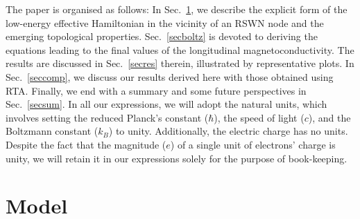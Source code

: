 \documentclass[aps,prb,onecolumn,nofootinbib,citeautoscript,10pt, showkeys]{revtex4-2}
\begin{document}
The paper is organised as follows: In Sec.~\ref{secmodel}, we describe the explicit form of the low-energy effective Hamiltonian in the vicinity of an RSWN node and the emerging topological properties. Sec.~\ref{secboltz} is devoted to deriving the equations leading to the final values of the longitudinal magnetoconductivity. The results are discussed in Sec.~\ref{secres} therein, illustrated by representative plots. In Sec.~\ref{seccomp}, we discuss our results derived here with those obtained using RTA. 
Finally, we end with a summary and some future perspectives in Sec.~\ref{secsum}. In all our expressions, we will adopt the natural units, which involves setting the reduced Planck's constant ($\hbar $), the speed of light ($c$), and the Boltzmann constant ($k_B $) to unity. Additionally, the electric charge has no units. Despite the fact that the magnitude ($e$) of a single unit of electrons' charge is unity, we will retain it in our expressions solely for the purpose of book-keeping. 


\section{Model}
\label{secmodel} 
\end{document}
